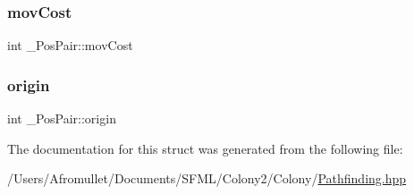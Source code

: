 \subsubsection{\texorpdfstring{mov\+Cost}{movCost}}
{\footnotesize\ttfamily int \+\_\+\+Pos\+Pair\+::mov\+Cost}

\mbox{\label{struct___pos_pair_a18ef19735976df84d1dda3185b844da0}} 
\subsubsection{\texorpdfstring{origin}{origin}}
{\footnotesize\ttfamily int \+\_\+\+Pos\+Pair\+::origin}



The documentation for this struct was generated from the following file\+:\begin{DoxyCompactItemize}
\item 
/\+Users/\+Afromullet/\+Documents/\+S\+F\+M\+L/\+Colony2/\+Colony/\mbox{\hyperlink{_pathfinding_8hpp}{Pathfinding.\+hpp}}\end{DoxyCompactItemize}
